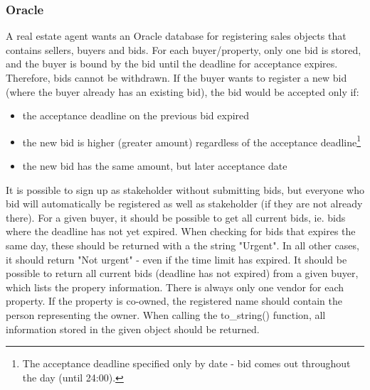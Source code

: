 \subsubsection{Oracle}
\label{sec:inf313_oracle}
A real estate agent wants an Oracle database for registering sales objects that contains sellers, buyers and bids. 
For each buyer/property, only one bid is stored, and the buyer is bound by the bid until the deadline for acceptance expires.
Therefore, bids cannot be withdrawn.
If the buyer wants to register a new bid (where the buyer already has an existing bid), the bid would be accepted only if:
\begin{itemize}
	\item the acceptance deadline on the previous bid expired
	\item the new bid is higher (greater amount) regardless of the acceptance deadline\footnote{
		The acceptance deadline specified only by date - bid comes out throughout the day (until 24:00).
	}
	\item the new bid has the same amount, but later acceptance date
\end{itemize}
It is possible to sign up as stakeholder without submitting bids, but everyone who bid will automatically be registered as well as stakeholder (if they are not already there).
\vspace{0.5em}\newline
For a given buyer, it should be possible to get all current bids, ie. bids where the deadline has not yet expired.
When checking for bids that expires the same day, these should be returned with a the string "Urgent".
In all other cases, it should return "Not urgent" - even if the time limit has expired.
It should be possible to return all current bids (deadline has not expired) from a given buyer, which lists the propery information. 
There is always only one vendor for each property.
If the property is co-owned, the registered name should contain the person representing the owner. 
When calling the to\_string() function, all information stored in the given object should be returned.

